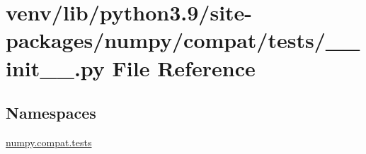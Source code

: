 \hypertarget{venv_2lib_2python3_89_2site-packages_2numpy_2compat_2tests_2____init_____8py}{}\section{venv/lib/python3.9/site-\/packages/numpy/compat/tests/\+\_\+\+\_\+init\+\_\+\+\_\+.py File Reference}
\label{venv_2lib_2python3_89_2site-packages_2numpy_2compat_2tests_2____init_____8py}
\subsection*{Namespaces}
\begin{DoxyCompactItemize}
\item 
 \hyperlink{namespacenumpy_1_1compat_1_1tests}{numpy.\+compat.\+tests}
\end{DoxyCompactItemize}
